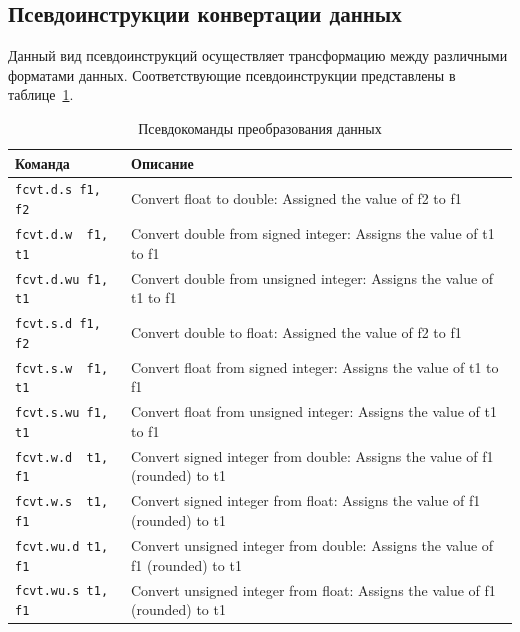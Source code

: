 \subsection{Псевдоинструкции конвертации данных}

Данный вид псевдоинструкций осуществляет трансформацию между различными форматами данных. Соответствующие псевдоинструкции представлены в таблице~\ref{table-fp-pseudo-convert}.

\begin{table}[h]
    \caption{Псевдокоманды преобразования данных}
    \centering
    \begin{tabularx}{\textwidth}{|l|X|}
        \hline
        \textbf{Команда} & \textbf{Описание} \\
        \hline \verb|fcvt.d.s f1, f2| & Convert float to double: Assigned the value of f2 to f1 \\
        \hline \verb|fcvt.d.w  f1, t1| & Convert double from signed integer: Assigns the value of t1 to f1 \\
        \hline \verb|fcvt.d.wu f1, t1| & Convert double from unsigned integer: Assigns the value of t1 to f1 \\
        \hline \verb|fcvt.s.d f1, f2| & Convert double to float: Assigned the value of f2 to f1 \\
        \hline \verb|fcvt.s.w  f1, t1| & Convert float from signed integer: Assigns the value of t1 to f1 \\
        \hline \verb|fcvt.s.wu f1, t1| & Convert float from unsigned integer: Assigns the value of t1 to f1 \\
        \hline \verb|fcvt.w.d  t1, f1| & Convert signed integer from double: Assigns the value of f1 (rounded) to t1 \\
        \hline \verb|fcvt.w.s  t1, f1| & Convert signed integer from float: Assigns the value of f1 (rounded) to t1 \\
        \hline \verb|fcvt.wu.d t1, f1| & Convert unsigned integer from double: Assigns the value of f1 (rounded) to t1 \\
        \hline \verb|fcvt.wu.s t1, f1| & Convert unsigned integer from float: Assigns the value of f1 (rounded) to t1 \\
        \hline
    \end{tabularx}
    \label{table-fp-pseudo-convert}
\end{table}

